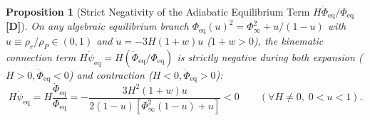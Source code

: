 \documentclass[11pt,a4paper]{article}
\newcommand{\catD}{\textbf{\textcolor{blue!75!black}{[D]}}}
\newtheorem{proposition}[theorem]{Proposition}
\theoremstyle{definition}
\theoremstyle{remark}
\begin{document}
\begin{proposition}[Strict Negativity of the Adiabatic Equilibrium Term $H\dot{\Phi}_{\text{eq}}/\Phi_{\text{eq}}$ \catD]
\label{prop:adiabatic_sign_theorem}
On any algebraic equilibrium branch $\Phi_{\text{eq}}(u)^2 = \Phi_{\infty}^2 + u/(1 - u)$ with $u \equiv \rho_r/\rho_P \in (0, 1)$ and $\dot{u} = -3H(1 + w)u$ ($1 + w > 0$), the kinematic connection term $H\dot{\psi}_{\text{eq}} = H(\dot{\Phi}_{\text{eq}}/\Phi_{\text{eq}})$ is strictly negative during both expansion ($H > 0, \dot{\Phi}_{\text{eq}} < 0$) and contraction ($H < 0, \dot{\Phi}_{\text{eq}} > 0$):
\begin{equation}
  H\dot{\psi}_{\text{eq}} = H\frac{\dot{\Phi}_{\text{eq}}}{\Phi_{\text{eq}}} = -\frac{3 H^2\left(1 + w\right)u}{2\left(1 - u\right)\left[\Phi_{\infty}^2\left(1 - u\right) + u\right]} < 0 \qquad (\forall H \neq 0, \; 0 < u < 1).
  \label{eq:h_dphi_negative_identity}
\end{equation}
\end{proposition}
\end{document}
